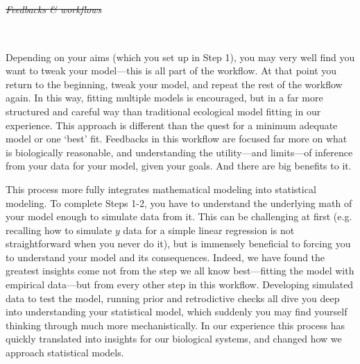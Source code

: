 \documentclass[11pt]{article}
\providecommand{\DIFaddtex}[1]{{\protect\color{blue}\uwave{#1}}} %
\providecommand{\DIFdeltex}[1]{{\protect\color{red}\sout{#1}}}                      %
\providecommand{\DIFaddbegin}{} %
\providecommand{\DIFaddend}{} %
\providecommand{\DIFdelbegin}{} %
\providecommand{\DIFdelend}{} %
\providecommand{\DIFadd}[1]{\texorpdfstring{\DIFaddtex{#1}}{#1}} %
\providecommand{\DIFdel}[1]{\texorpdfstring{\DIFdeltex{#1}}{}} %
\newcommand{\DIFscaledelfig}{0.5}
\newlength{\DIFdelgraphicswidth} %
\newlength{\DIFdelgraphicsheight} %
\newcommand{\DIFaddincludegraphics}[2][]{{\color{blue}\fbox{\DIFOincludegraphics[#1]{#2}}}} %
\newcommand{\DIFdelincludegraphics}[2][]{%
\sbox{\DIFdelgraphicsbox}{\DIFOincludegraphics[#1]{#2}}%
\settoboxwidth{\DIFdelgraphicswidth}{\DIFdelgraphicsbox} %
\settoboxtotalheight{\DIFdelgraphicsheight}{\DIFdelgraphicsbox} %
\scalebox{\DIFscaledelfig}{%
\parbox[b]{\DIFdelgraphicswidth}{\usebox{\DIFdelgraphicsbox}\\[-\baselineskip] \rule{\DIFdelgraphicswidth}{0em}}\llap{\resizebox{\DIFdelgraphicswidth}{\DIFdelgraphicsheight}{%
\setlength{\unitlength}{\DIFdelgraphicswidth}%
\begin{picture}(1,1)%
\thicklines\linethickness{2pt} %
{\color[rgb]{1,0,0}\put(0,0){\framebox(1,1){}}}%
{\color[rgb]{1,0,0}\put(0,0){\line( 1,1){1}}}%
{\color[rgb]{1,0,0}\put(0,1){\line(1,-1){1}}}%
\end{picture}%
}\hspace*{3pt}}} %
} %
\DeclareRobustCommand{\DIFaddbegin}{\DIFOaddbegin \let\includegraphics\DIFaddincludegraphics} %
\DeclareRobustCommand{\DIFaddend}{\DIFOaddend \let\includegraphics\DIFOincludegraphics} %
\DeclareRobustCommand{\DIFdelbegin}{\DIFOdelbegin \let\includegraphics\DIFdelincludegraphics} %
\DeclareRobustCommand{\DIFdelend}{\DIFOaddend \let\includegraphics\DIFOincludegraphics} %
\begin{document}
\DIFdelbegin \emph{\DIFdel{Feedbacks \& workflows}}%
\DIFdelend \DIFaddbegin \subsection{\DIFadd{Feedbacks \& workflows}}\DIFaddend \\
Depending on your aims (which you set up in Step 1), you may very well find you want to tweak your model---this is all part of the workflow. At that point you return to the beginning, tweak your model, and repeat the rest of the workflow again. In this way, fitting multiple models is encouraged, but in a far more structured and careful way than traditional ecological model fitting in our experience. This approach is different than the quest for a minimum adequate model or one `best' fit. Feedbacks in this workflow are focused far more on what is biologically reasonable, and understanding the utility---and limits---of inference from your data for your model, given your goals.  And there are big benefits to it. 

This process more fully integrates mathematical modeling into statistical modeling. To complete Steps 1-2, you have to understand the underlying math of your model enough to simulate data from it. This can be challenging at first (e.g. recalling how to simulate $y$ data for a simple linear regression is not straightforward when you never do it), but is immensely beneficial to forcing you to understand your model and its consequences. Indeed, we have found the greatest insights come not from the step we all know best---fitting the model with empirical data---but from every other step in this workflow. Developing simulated data to test the model, running prior and retrodictive checks all dive you deep into understanding your statistical model, which suddenly you may find yourself thinking through much more mechanistically. In our experience this process has quickly translated into insights for our biological systems, and changed how we approach statistical models. %

\end{document}
